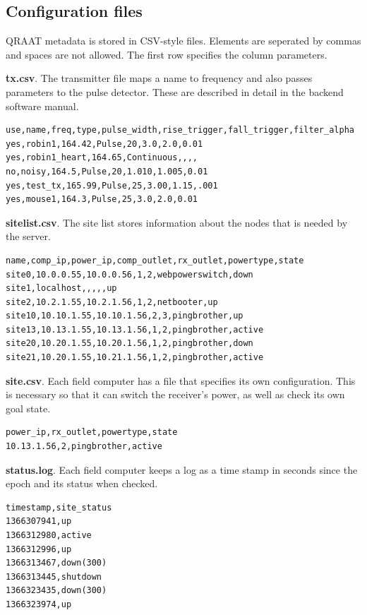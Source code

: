 \documentclass[letter]{article}
\begin{document}
\pagebreak
\begin{appendices}

\section{Configuration files}
QRAAT metadata is stored in CSV-style files. Elements are seperated by commas and 
spaces are not allowed. The first row specifies the column parameters. 

\textbf{tx.csv}. The transmitter file maps a name to frequency and also passes 
parameters to the pulse detector. These are described in detail in the backend
software manual. 
\begin{verbatim}
use,name,freq,type,pulse_width,rise_trigger,fall_trigger,filter_alpha
yes,robin1,164.42,Pulse,20,3.0,2.0,0.01
yes,robin1_heart,164.65,Continuous,,,,
no,noisy,164.5,Pulse,20,1.010,1.005,0.01
yes,test_tx,165.99,Pulse,25,3.00,1.15,.001
yes,mouse1,164.3,Pulse,25,3.0,2.0,0.01
\end{verbatim}

\textbf{sitelist.csv}. The site list stores information about the nodes that is needed
by the server. 
\begin{verbatim}
name,comp_ip,power_ip,comp_outlet,rx_outlet,powertype,state
site0,10.0.0.55,10.0.0.56,1,2,webpowerswitch,down
site1,localhost,,,,,up
site2,10.2.1.55,10.2.1.56,1,2,netbooter,up
site10,10.10.1.55,10.10.1.56,2,3,pingbrother,up
site13,10.13.1.55,10.13.1.56,1,2,pingbrother,active
site20,10.20.1.55,10.20.1.56,1,2,pingbrother,down
site21,10.20.1.55,10.21.1.56,1,2,pingbrother,active
\end{verbatim}

\textbf{site.csv}. Each field computer has a file that specifies its own configuration. 
This is necessary so that it can switch the receiver's power, as well as check its own 
goal state. 
\begin{verbatim}
power_ip,rx_outlet,powertype,state
10.13.1.56,2,pingbrother,active
\end{verbatim}

\textbf{status.log}. Each field computer keeps a log as a time stamp
in seconds since the epoch and its status when checked. 
\begin{verbatim}
timestamp,site_status
1366307941,up
1366312980,active
1366312996,up
1366313467,down(300)
1366313445,shutdown
1366323435,down(300)
1366323974,up
\end{verbatim}

\end{appendices}
\end{document}
